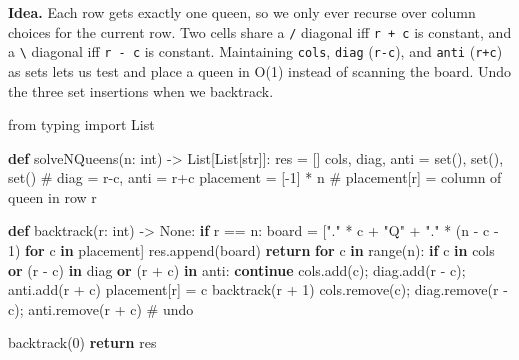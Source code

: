 \documentclass[11pt]{article}
\newenvironment{Shaded}{\begin{snugshade}}{\end{snugshade}}
\newcommand{\BuiltInTok}[1]{\textcolor[rgb]{0.50,0.55,0.55}{#1}}
\newcommand{\CommentTok}[1]{\textcolor[rgb]{0.48,0.49,0.49}{#1}}
\newcommand{\ControlFlowTok}[1]{\textcolor[rgb]{0.99,0.74,0.29}{\textbf{#1}}}
\newcommand{\DecValTok}[1]{\textcolor[rgb]{0.96,0.45,0.00}{#1}}
\newcommand{\ImportTok}[1]{\textcolor[rgb]{0.15,0.68,0.38}{#1}}
\newcommand{\KeywordTok}[1]{\textcolor[rgb]{0.81,0.81,0.76}{\textbf{#1}}}
\newcommand{\NormalTok}[1]{\textcolor[rgb]{0.81,0.81,0.76}{#1}}
\newcommand{\OperatorTok}[1]{\textcolor[rgb]{0.81,0.81,0.76}{#1}}
\newcommand{\StringTok}[1]{\textcolor[rgb]{0.96,0.31,0.31}{#1}}
\newcommand{\VariableTok}[1]{\textcolor[rgb]{0.15,0.68,0.68}{#1}}
\begin{document}
\textbf{Idea.} Each row gets exactly one queen, so we only ever recurse over column choices for the current row. Two cells share a \texttt{/} diagonal iff \texttt{r\ +\ c} is constant, and a \texttt{\textbackslash{}} diagonal iff \texttt{r\ -\ c} is constant. Maintaining \texttt{cols}, \texttt{diag} (\texttt{r-c}), and \texttt{anti} (\texttt{r+c}) as sets lets us test and place a queen in O(1) instead of scanning the board. Undo the three set insertions when we backtrack.


\begin{Shaded}
\begin{Highlighting}[]
\ImportTok{from}\NormalTok{ typing }\ImportTok{import}\NormalTok{ List}

\KeywordTok{def}\NormalTok{ solveNQueens(n: }\BuiltInTok{int}\NormalTok{) }\OperatorTok{{-}\textgreater{}}\NormalTok{ List[List[}\BuiltInTok{str}\NormalTok{]]:}
\NormalTok{    res }\OperatorTok{=}\NormalTok{ []}
\NormalTok{    cols, diag, anti }\OperatorTok{=} \BuiltInTok{set}\NormalTok{(), }\BuiltInTok{set}\NormalTok{(), }\BuiltInTok{set}\NormalTok{()   }\CommentTok{\# diag = r{-}c, anti = r+c}
\NormalTok{    placement }\OperatorTok{=}\NormalTok{ [}\OperatorTok{{-}}\DecValTok{1}\NormalTok{] }\OperatorTok{*}\NormalTok{ n                       }\CommentTok{\# placement[r] = column of queen in row r}

    \KeywordTok{def}\NormalTok{ backtrack(r: }\BuiltInTok{int}\NormalTok{) }\OperatorTok{{-}\textgreater{}} \VariableTok{None}\NormalTok{:}
        \ControlFlowTok{if}\NormalTok{ r }\OperatorTok{==}\NormalTok{ n:}
\NormalTok{            board }\OperatorTok{=}\NormalTok{ [}\StringTok{"."} \OperatorTok{*}\NormalTok{ c }\OperatorTok{+} \StringTok{"Q"} \OperatorTok{+} \StringTok{"."} \OperatorTok{*}\NormalTok{ (n }\OperatorTok{{-}}\NormalTok{ c }\OperatorTok{{-}} \DecValTok{1}\NormalTok{) }\ControlFlowTok{for}\NormalTok{ c }\KeywordTok{in}\NormalTok{ placement]}
\NormalTok{            res.append(board)}
            \ControlFlowTok{return}
        \ControlFlowTok{for}\NormalTok{ c }\KeywordTok{in} \BuiltInTok{range}\NormalTok{(n):}
            \ControlFlowTok{if}\NormalTok{ c }\KeywordTok{in}\NormalTok{ cols }\KeywordTok{or}\NormalTok{ (r }\OperatorTok{{-}}\NormalTok{ c) }\KeywordTok{in}\NormalTok{ diag }\KeywordTok{or}\NormalTok{ (r }\OperatorTok{+}\NormalTok{ c) }\KeywordTok{in}\NormalTok{ anti:}
                \ControlFlowTok{continue}
\NormalTok{            cols.add(c)}\OperatorTok{;}\NormalTok{ diag.add(r }\OperatorTok{{-}}\NormalTok{ c)}\OperatorTok{;}\NormalTok{ anti.add(r }\OperatorTok{+}\NormalTok{ c)}
\NormalTok{            placement[r] }\OperatorTok{=}\NormalTok{ c}
\NormalTok{            backtrack(r }\OperatorTok{+} \DecValTok{1}\NormalTok{)}
\NormalTok{            cols.remove(c)}\OperatorTok{;}\NormalTok{ diag.remove(r }\OperatorTok{{-}}\NormalTok{ c)}\OperatorTok{;}\NormalTok{ anti.remove(r }\OperatorTok{+}\NormalTok{ c)  }\CommentTok{\# undo}

\NormalTok{    backtrack(}\DecValTok{0}\NormalTok{)}
    \ControlFlowTok{return}\NormalTok{ res}
\end{Highlighting}
\end{Shaded}
\end{document}
